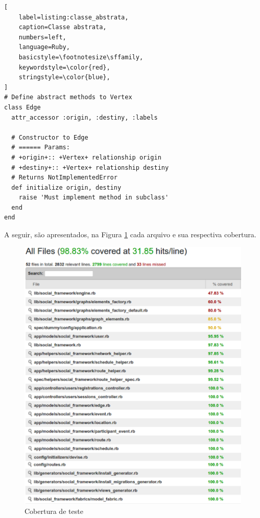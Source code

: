  \begin{lstlisting}[
    label=listing:classe_abstrata,
    caption=Classe abstrata,
    numbers=left,
    language=Ruby,
    basicstyle=\footnotesize\sffamily,
    keywordstyle=\color{red},
    stringstyle=\color{blue},
]
# Define abstract methods to Vertex
class Edge
  attr_accessor :origin, :destiny, :labels
  
  # Constructor to Edge
  # ====== Params:
  # +origin+:: +Vertex+ relationship origin
  # +destiny+:: +Vertex+ relationship destiny
  # Returns NotImplementedError
  def initialize origin, destiny
    raise 'Must implement method in subclass'
  end
end
\end{lstlisting}

A seguir, são apresentados, na Figura \ref{Cobertura_teste} cada arquivo e sua respectiva cobertura.

\begin{figure}[!h]
	\centering
	\includegraphics[scale=0.60]{figuras/resultados/cobertura.eps}
	\caption[Cobertura de teste]{Cobertura de teste}
	\label{Cobertura_teste}
\end{figure}


